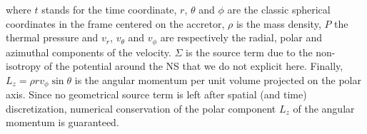 \documentclass{aa}
\makeatletter
\newcommand*{\ns}{NS\@\xspace}
\newcommand*{\ie}{i.e.\@\xspace}
\makeatother
\begin{document}
where $t$ stands for the time coordinate, $r$, $\theta$ and $\phi$ are the classic spherical coordinates in the frame centered on the accretor, $\rho$ is the mass density, $P$ the thermal pressure and $v_{r}$, $v_{\theta}$ and $v_{\phi}$ are respectively the radial, polar and azimuthal components of the velocity. $\Sigma$ is the source term due to the non-isotropy of the potential around the \ns that we do not explicit here. Finally, $L_z=\rho r v_{\phi} \sin\theta$ is the angular momentum per unit volume projected on the polar axis. Since no geometrical source term is left after spatial (and time) discretization, numerical conservation of the polar component $L_z$ of the angular momentum is guaranteed.
 

%
%
\end{document}
